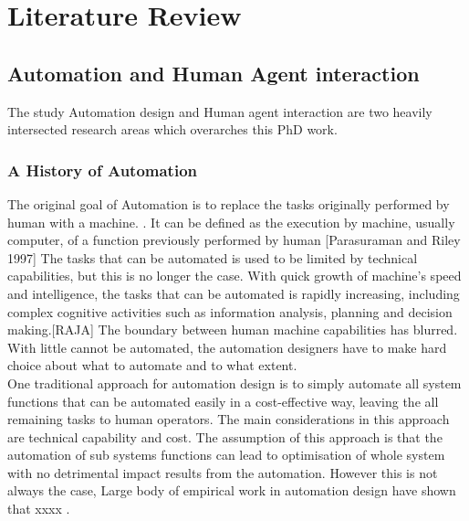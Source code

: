 \chapter{Literature Review}\label{ch:examples}
\section{Automation and Human Agent interaction}
The study Automation design and Human agent interaction are two heavily intersected research areas which overarches this PhD work.  


\subsection{A History of Automation }
The original goal of Automation is to replace the tasks originally performed by human with a machine. \cite{Bradshaw2011} . It can be defined as the execution by machine, usually computer, of a function previously performed by human [Parasuraman and Riley 1997] The tasks that can be automated is used to be limited by technical capabilities, but this is no longer the case. With quick growth of machine's speed and intelligence, the tasks that can be automated is rapidly increasing, including complex cognitive activities such as information analysis, planning and decision making.[RAJA] The boundary between human machine capabilities has blurred. With little cannot be automated, the automation designers have to make hard choice about what to automate and to what extent.\\

One traditional approach for automation design is to simply automate all system functions that can be automated easily in a cost-effective way, leaving the all remaining tasks to human operators. The main considerations in this approach are technical capability and cost. The assumption of this approach is that the automation of sub systems functions can lead to optimisation of whole system with no detrimental impact results from the automation. However this is not always the case, Large body of empirical work in automation design have shown that xxxx .\\ 

